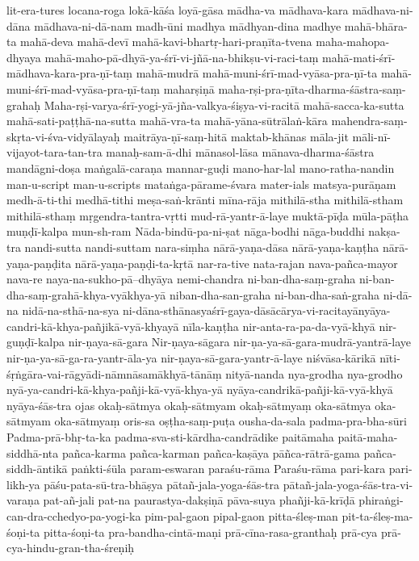 {lit-era-tures
locana-roga
lokā-kāśa
loyā-gāsa
mādha-va
mādhava-kara
mādhava-ni-dāna
mādhava-ni-dā-nam
madh-ūni
madhya
mādhyan-dina
madhye
mahā-bhāra-ta
mahā-deva
mahā-devī
mahā-kavi-bhartṛ-hari-praṇīta-tvena
maha-mahopa-dhyaya
mahā-maho-pā-dhyā-ya-śrī-vi-jñā-na-bhikṣu-vi-raci-taṃ
mahā-mati-śrī-mādhava-kara-pra-ṇī-taṃ
mahā-mudrā
mahā-muni-śrī-mad-vyāsa-pra-ṇī-ta
mahā-muni-śrī-mad-vyāsa-pra-ṇī-taṃ
maharṣiṇā
maha-rṣi-pra-ṇīta-dharma-śāstra-saṃ-grahaḥ
Maha-rṣi-varya-śrī-yogi-yā-jña-valkya-śiṣya-vi-racitā
mahā-sacca-ka-sutta
mahā-sati-paṭṭhā-na-sutta
mahā-vra-ta
mahā-yāna-sūtrālaṅ-kāra
mahendra-saṃ-skṛta-vi-śva-vidyālayaḥ
maitrāya-ṇī-saṃ-hitā
maktab-khānas
māla-jit
māli-nī-vijayot-tara-tan-tra
manaḥ-sam-ā-dhi
mānasol-lāsa
mānava-dharma-śāstra
mandāgni-doṣa
maṅgalā-caraṇa
mannar-guḍi
mano-har-lal
mano-ratha-nandin
man-u-script
man-u-scripts
mataṅga-pārame-śvara
mater-ials
matsya-purāṇam
medh-ā-ti-thi
medhā-tithi
meṣa-saṅ-krānti
mīna-rāja
mithilā-stha
mithilā-stham
mithilā-sthaṃ
mṛgendra-tantra-vṛtti
mud-rā-yantr-ā-laye
muktā-pīḍa
mūla-pāṭha
muṇḍī-kalpa
mun-sh-ram
Nāda-bindū-pa-ni-ṣat
nāga-bodhi
nāga-buddhi
nakṣa-tra
nandi-sutta
nandi-suttam
nara-siṃha
nārā-yaṇa-dāsa
nārā-yaṇa-kaṇṭha
nārā-yaṇa-paṇḍita
nārā-yaṇa-paṇḍi-ta-kṛtā
nar-ra-tive
nata-rajan
nava-pañca-mayor
nava-re
naya-na-sukho-pā--dhyāya
nemi-chandra
ni-ban-dha-saṃ-graha
ni-ban-dha-saṃ-grahā-khya-vyākhya-yā
niban-dha-san-graha
ni-ban-dha-saṅ-graha
ni-dā-na
nidā-na-sthā-na-sya
ni-dāna-sthānasyaśrī-gaya-dāsācārya-vi-racitayānyāya-candri-kā-khya-pañjikā-vyā-khyayā
nīla-kaṇṭha
nir-anta-ra-pa-da-vyā-khyā
nir-guṇḍī-kalpa
nir-ṇaya-sā-gara
Nir-ṇaya-sāgara
nir-ṇa-ya-sā-gara-mudrā-yantrā-laye
nir-ṇa-ya-sā-ga-ra-yantr-āla-ya
nir-ṇaya-sā-gara-yantr-ā-laye
niśvāsa-kārikā
nīti-śṛṅgāra-vai-rāgyādi-nāmnāsamākhyā-tānāṃ
nityā-nanda
nya-grodha
nya-grodho
nyā-ya-candri-kā-khya-pañji-kā-vyā-khya-yā
nyāya-candrikā-pañji-kā-vyā-khyā
nyāya-śās-tra
ojas
okaḥ-sātmya
okaḥ-sātmyam
okaḥ-sātmyaṃ
oka-sātmya
oka-sātmyam
oka-sātmyaṃ
oris-sa
oṣṭha-saṃ-puṭa
ousha-da-sala
padma-pra-bha-sūri
Padma-prā-bhṛ-ta-ka
padma-sva-sti-kārdha-candrādike
paitāmaha
paitā-maha-siddhā-nta
pañca-karma
pañca-karman
pañca-kaṣāya
pāñca-rātrā-gama
pañca-siddh-āntikā
paṅkti-śūla
param-eswaran
paraśu-rāma
Paraśu-rāma
pari-kara
pari-likh-ya
pāśu-pata-sū-tra-bhāṣya
pātañ-jala-yoga-śās-tra
pātañ-jala-yoga-śās-tra-vi-varaṇa
pat-añ-jali
pat-na
paurastya-dakṣiṇā
pāva-suya
phañji-kā-krīḍā
phiraṅgi-can-dra-cchedyo-pa-yogi-ka
pim-pal-gaon
pipal-gaon
pitta-śleṣ-man
pit-ta-śleṣ-ma-śoṇi-ta
pitta-śoṇi-ta
pra-bandha-cintā-maṇi
prā-cīna-rasa-granthaḥ
prā-cya
prā-cya-hindu-gran-tha-śreṇiḥ
}
